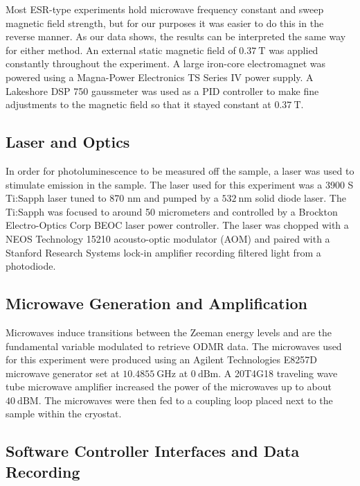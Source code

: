 \documentclass[oneside]{BYUPhys}
\begin{document}
Most ESR-type experiments hold microwave frequency constant and sweep magnetic field strength, but for our purposes it was easier to do this in the reverse manner. As our data shows, the results can be interpreted the same way for either method. An external static magnetic field of $0.37~\text{T}$ was applied constantly throughout the experiment. A large iron-core electromagnet was powered using a Magna-Power Electronics TS Series IV power supply. A Lakeshore DSP 750 gaussmeter was used as a PID controller to make fine adjustments to the magnetic field so that it stayed constant at $0.37~\text{T}$.

\subsection{Laser and Optics}

In order for photoluminescence to be measured off the sample, a laser was used to stimulate emission in the sample. The laser used for this experiment was a 3900 S Ti:Sapph laser tuned to 870 nm and pumped by a $532~\text{nm}$ solid diode laser. The Ti:Sapph was focused to around 50 micrometers and controlled by a Brockton Electro-Optics Corp BEOC laser power controller. The laser was chopped with a NEOS Technology 15210 acousto-optic modulator (AOM) and paired with a Stanford Research Systems lock-in amplifier recording filtered light from a photodiode.

\subsection{Microwave Generation and Amplification}

Microwaves induce transitions between the Zeeman energy levels and are the fundamental variable modulated to retrieve ODMR data. The microwaves used for this experiment were produced using an Agilent Technologies E8257D microwave generator set at $10.4855~\text{GHz}$ at $0~\text{dBm}$. A 20T4G18 traveling wave tube microwave amplifier increased the power of the microwaves up to about $40~\text{dBM}$. The microwaves were then fed to a coupling loop placed next to the sample within the cryostat.

\subsection{Software Controller Interfaces and Data Recording}
\end{document}
